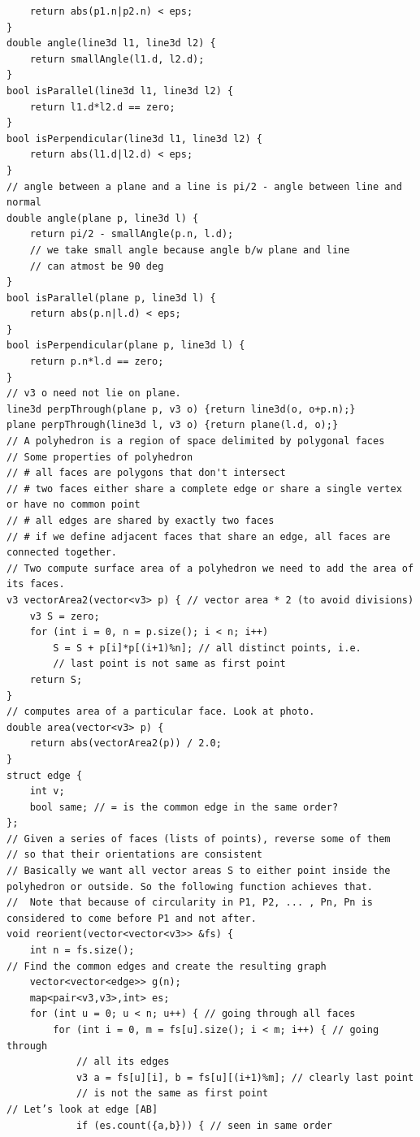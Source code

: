 \documentclass[8pt, a4paper, oneside, twocolumn]{extarticle}
\begin{document}
\begin{verbatim}
    return abs(p1.n|p2.n) < eps;
}
double angle(line3d l1, line3d l2) {
    return smallAngle(l1.d, l2.d);
}
bool isParallel(line3d l1, line3d l2) {
    return l1.d*l2.d == zero;
}
bool isPerpendicular(line3d l1, line3d l2) {
    return abs(l1.d|l2.d) < eps;
}
// angle between a plane and a line is pi/2 - angle between line and normal
double angle(plane p, line3d l) {
    return pi/2 - smallAngle(p.n, l.d);
    // we take small angle because angle b/w plane and line
    // can atmost be 90 deg
}
bool isParallel(plane p, line3d l) {
    return abs(p.n|l.d) < eps;
}
bool isPerpendicular(plane p, line3d l) {
    return p.n*l.d == zero;
}
// v3 o need not lie on plane.
line3d perpThrough(plane p, v3 o) {return line3d(o, o+p.n);}
plane perpThrough(line3d l, v3 o) {return plane(l.d, o);}
// A polyhedron is a region of space delimited by polygonal faces
// Some properties of polyhedron
// # all faces are polygons that don't intersect
// # two faces either share a complete edge or share a single vertex or have no common point
// # all edges are shared by exactly two faces
// # if we define adjacent faces that share an edge, all faces are connected together.
// Two compute surface area of a polyhedron we need to add the area of its faces.
v3 vectorArea2(vector<v3> p) { // vector area * 2 (to avoid divisions)
    v3 S = zero;
    for (int i = 0, n = p.size(); i < n; i++)
        S = S + p[i]*p[(i+1)%n]; // all distinct points, i.e.
        // last point is not same as first point
    return S;
}
// computes area of a particular face. Look at photo.
double area(vector<v3> p) {
    return abs(vectorArea2(p)) / 2.0;
}
struct edge {
    int v;
    bool same; // = is the common edge in the same order?
};
// Given a series of faces (lists of points), reverse some of them
// so that their orientations are consistent
// Basically we want all vector areas S to either point inside the polyhedron or outside. So the following function achieves that.
//  Note that because of circularity in P1, P2, ... , Pn, Pn is considered to come before P1 and not after.
void reorient(vector<vector<v3>> &fs) {
    int n = fs.size();
// Find the common edges and create the resulting graph
    vector<vector<edge>> g(n);
    map<pair<v3,v3>,int> es;
    for (int u = 0; u < n; u++) { // going through all faces
        for (int i = 0, m = fs[u].size(); i < m; i++) { // going through
            // all its edges
            v3 a = fs[u][i], b = fs[u][(i+1)%m]; // clearly last point
            // is not the same as first point
// Let’s look at edge [AB]
            if (es.count({a,b})) { // seen in same order

\end{verbatim}
\end{document}
